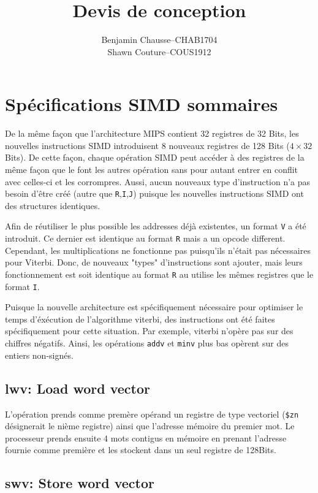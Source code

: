 \documentclass[a11paper]{article}
\title{Devis de conception}
\author{
  \addtolength{\tabcolsep}{-0.4em}
  \begin{tabular}{rcl} %
      Benjamin Chausse & -- & CHAB1704 \\
      Shawn Couture    & -- & COUS1912 \\
  \end{tabular}
}
\begin{document}
\maketitle
\newpage
\tableofcontents
\newpage

\section{Spécifications SIMD sommaires}

De la même façon que l'architecture MIPS contient 32 registres de 32 Bits, les
nouvelles instructions SIMD introduisent 8 nouveaux registres de 128 Bits
($4\times32$ Bits). De cette façon, chaque opération SIMD peut accéder à des
registres de la même façon que le font les autres opération sans pour autant
entrer en conflit avec celles-ci et les corrompres. Aussi, aucun nouveaux type
d'instruction n'a pas besoin d'être créé (autre que \verb|R|,\verb|I|,\verb|J|)
puisque les nouvelles instructions SIMD ont des structures identiques.

Afin de réutiliser le plus possible les addresses déjà existentes, un format
\verb|V| a été introduit. Ce dernier est identique au format \verb|R| mais a un
opcode different. Cependant, les multiplications ne fonctionne pas puisqu'ils
n'était pas nécessaires pour Viterbi. Donc, de nouveaux "types" d'instructions
sont ajouter, mais leurs fonctionnement est soit identique au format \verb|R|
au utilise les mêmes registres que le format \verb|I|.

Puisque la nouvelle architecture est spécifiquement nécessaire pour optimiser
le temps d'éxécution de l'algorithme viterbi, des instructions ont été faites
spécifiquement pour cette situation. Par exemple, viterbi n'opère pas sur des
chiffres négatifs. Ainsi, les opérations \verb|addv| et \verb|minv| plus bas
opèrent sur des entiers non-signés.

\subsection{lwv: Load word vector}

L'opération prends comme premère opérand un registre de type vectoriel
(\verb|$zn| désignerait le nième registre) ainsi que l'adresse mémoire du
premier mot. Le processeur prends ensuite 4 mots contigus en mémoire en prenant
l'adresse fournie comme première et les stockent dans un seul registre de
128Bits.

\subsection{swv: Store word vector}
\end{document}
